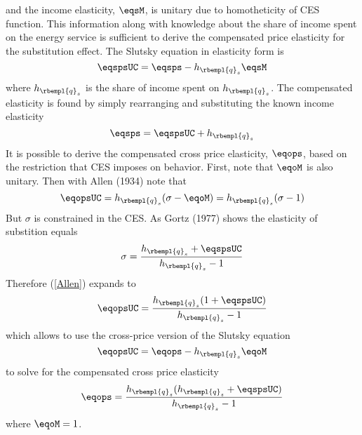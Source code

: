 and the income elasticity, $\eqsM$, is unitary due to homotheticity of CES function.
This information along with knowledge about the share of income spent on the
energy service is sufficient to derive the compensated price elasticity for
the substitution effect. The Slutsky equation in elasticity form is
\begin{equation}
  \eqspsUC = \eqsps - h_{\rbempl{q}_s} \eqsM
\end{equation}
where $h_{\rbempl{q}_s}$ is the share of income spent on $h_{\rbempl{q}_s}$.
The compensated elasticity is found by simply rearranging and substituting the known 
income elasticity
\begin{equation}
  \eqsps = \eqspsUC + h_{\rbempl{q}_s}
\end{equation}
It is possible to derive the compensated cross price elasticity, $\eqops$, based
on the restriction that CES imposes on behavior.
First, note that $\eqoM$ is also unitary.
Then with Allen (1934) note that
\begin{equation}
  \eqopsUC = h_{\rbempl{q}_s} ( \sigma - \eqoM) = h_{\rbempl{q}_s} ( \sigma - 1)
  \label{Allen}
\end{equation}
But $\sigma$ is constrained in the CES. As Gortz (1977) shows the elasticity 
of substition equals
\begin{equation}
  \sigma  = \frac{h_{\rbempl{q}_s} + \eqspsUC}{h_{\rbempl{q}_s} -1 }
\end{equation}
Therefore (\ref{Allen}) expands to 
\begin{equation}
  \eqopsUC =  \frac{h_{\rbempl{q}_s} (1 + \eqspsUC)}{h_{\rbempl{q}_s}-1}
\end{equation}
which allows to use the cross-price version of the Slutsky equation
\begin{equation}
  \eqopsUC = \eqops - h_{\rbempl{q}_s} \eqoM
\end{equation}
to solve for the compensated cross price elasticity
\begin{equation}
  \eqops = \frac{h_{\rbempl{q}_s} (h_{\rbempl{q}_s} + \eqspsUC)}{h_{\rbempl{q}_s}-1}
\end{equation}
where $\eqoM = 1$.